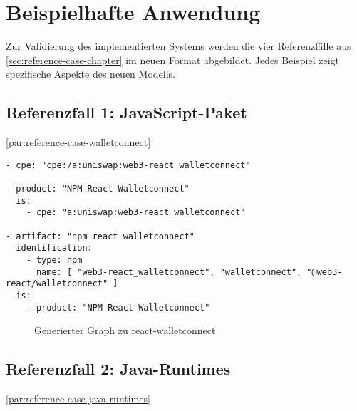 \section{Beispielhafte Anwendung}\label{sec:beispiele-fertige-implementierung}

Zur Validierung des implementierten Systems werden die vier Referenzfälle aus \autoref{sec:reference-case-chapter} im neuen Format abgebildet.
Jedes Beispiel zeigt spezifische Aspekte des neuen Modells.

\subsection{Referenzfall 1: JavaScript-Paket}\label{subsec:example-js-package}
\autoref{par:reference-case-walletconnect}

\begin{lstlisting}[style=yaml,caption={Produktmodellierung zu react-walletconnect},label={lst:new-correlation-walletconnect},basicstyle=\ttfamily\scriptsize]
- cpe: "cpe:/a:uniswap:web3-react_walletconnect"

- product: "NPM React Walletconnect"
  is:
    - cpe: "a:uniswap:web3-react_walletconnect"

- artifact: "npm react walletconnect"
  identification:
    - type: npm
      name: [ "web3-react_walletconnect", "walletconnect", "@web3-react/walletconnect" ]
  is:
    - product: "NPM React Walletconnect"
\end{lstlisting}

\begin{figure}[htbp]
    \centering
    \makebox[\textwidth]{}
    \caption{Generierter Graph zu react-walletconnect}
    \label{fig:example-graph-walletconnect}
\end{figure}

\subsection{Referenzfall 2: Java-Runtimes}\label{subsec:example-java-runtimes}
\autoref{par:reference-case-java-runtimes}

